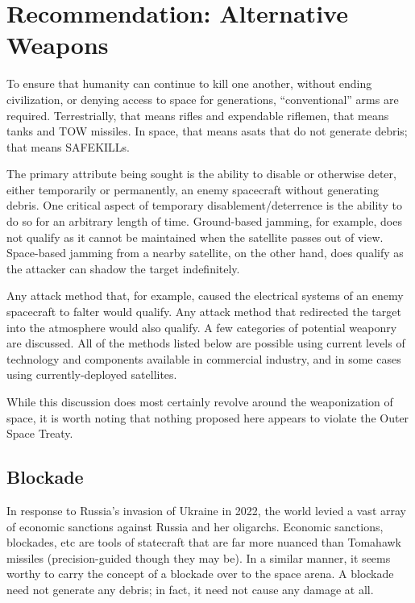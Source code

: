 \section{Recommendation: Alternative Weapons}

To ensure that humanity can continue to kill one another, without
ending civilization, or denying access to space for generations,
``conventional'' arms are required.  Terrestrially, that means rifles
and expendable riflemen, that means tanks and TOW missiles.  In space,
that means \acp{asat} that do not generate debris; that means
SAFEKILLs.

The primary attribute being sought is the ability to disable or
otherwise deter, either temporarily or permanently, an enemy
spacecraft without generating debris.  One critical aspect of
temporary disablement/deterrence is the ability to do so for an
arbitrary length of time.  Ground-based jamming, for example, does not
qualify as it cannot be maintained when the satellite passes out of
view.  Space-based jamming from a nearby satellite, on the other hand,
does qualify as the attacker can shadow the target indefinitely.

Any attack method that, for example, caused the electrical systems of
an enemy spacecraft to falter would qualify.  Any attack method that
redirected the target into the atmosphere would also qualify.  A few
categories of potential weaponry are discussed.  All of the methods
listed below are possible using current levels of technology and
components available in commercial industry, and in some cases using
currently-deployed satellites.

While this discussion does most certainly revolve around the
weaponization of space, it is worth noting that nothing proposed here
appears to violate the Outer Space Treaty.\cite{outer-space}

\subsection{Blockade}
In response to Russia's invasion of Ukraine in 2022, the world levied
a vast array of economic sanctions against Russia and her
oligarchs.\cite{russian-economy} Economic sanctions, blockades, etc
are tools of statecraft that are far more nuanced than Tomahawk
missiles (precision-guided though they may be).  In a similar manner,
it seems worthy to carry the concept of a blockade over to the space
arena.  A blockade need not generate any debris; in fact, it need not
cause any damage at all.


